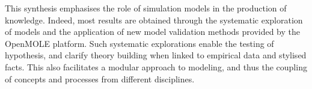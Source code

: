 \documentclass[11pt]{article}
\begin{document}
This synthesis emphasises the role of simulation models in the production of knowledge. Indeed, most results are obtained through the systematic exploration of models and the application of new model validation methods provided by the OpenMOLE platform. Such systematic explorations enable the testing of hypothesis, and clarify theory building when linked to empirical data and stylised facts. This also facilitates a modular approach to modeling, and thus the coupling of concepts and processes from different disciplines.











%
%

\end{document}
